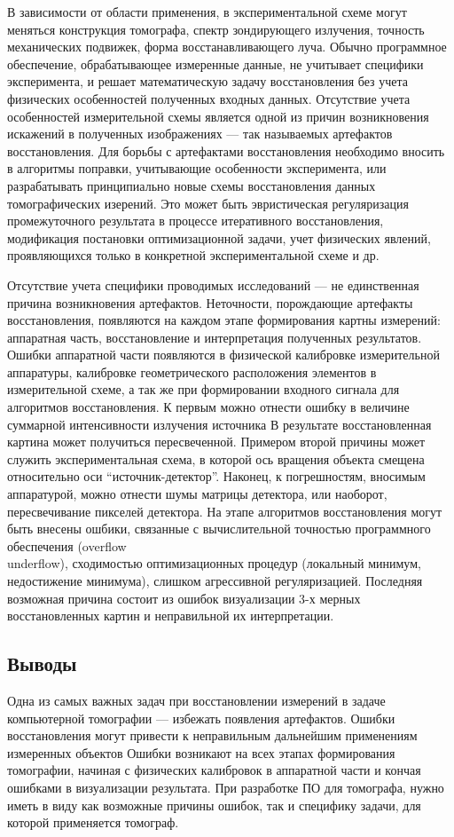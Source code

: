 В зависимости от области применения, в экспериментальной схеме могут меняться конструкция томографа, спектр зондирующего излучения, точность механических подвижек, форма восстанавливающего луча.
Обычно программное обеспечение, обрабатывающее измеренные данные, не учитывает специфики эксперимента, и решает математическую задачу восстановления без учета физических особенностей полученных входных данных.
Отсутствие учета особенностей измерительной схемы является одной из причин возникновения искажений в полученных изображениях --- так называемых артефактов восстановления.
Для борьбы с артефактами восстановления необходимо вносить в алгоритмы поправки, учитывающие особенности эксперимента, или разрабатывать принципиально новые схемы восстановления данных томографических изерений.
Это может быть эвристическая регуляризация промежуточного результата в процессе итеративного восстановления, модификация постановки оптимизационной задачи, учет физических явлений, проявляющихся только в конкретной экспериментальной схеме и др.


Отсутствие учета специфики проводимых исследований --- не единственная причина возникновения артефактов. 
Неточности, порождающие артефакты восстановления, появляются на каждом этапе формирования картны измерений: аппаратная часть, восстановление и интерпретация полученных результатов.
Ошибки аппаратной части появляются в физической калибровке измерительной аппаратуры, калибровке геометрического расположения элементов в измерительной схеме, а так же при формировании входного сигнала для алгоритмов восстановления. 
К первым можно отнести ошибку в величине суммарной интенсивности излучения источника
В результате восстановленная картина может получиться пересвеченной.
Примером второй причины может служить экспериментальная схема, в которой ось вращения объекта смещена относительно оси ``источник-детектор''.
Наконец, к погрешностям, вносимым аппаратурой, можно отнести шумы матрицы детектора, или наоборот, пересвечивание пикселей детектора.
На этапе алгоритмов восстановления могут быть внесены ошбики, связанные с вычислительной точностью программного обеспечения (overflow\\underflow), сходимостью оптимизационных процедур (локальный минимум, недостижение минимума), слишком агрессивной регуляризацией. 
Последняя возможная причина состоит из ошибок визуализации 3-х мерных восстановленных картин и неправильной их интерпретации.

\subsection{Выводы}
Одна из самых важных задач при восстановлении измерений в задаче компьютерной томографии --- избежать появления артефактов.
Ошибки восстановления могут привести к неправильным дальнейшим применениям измеренных объектов
Ошибки возникают на всех этапах формирования томографии, начиная с физических калибровок в аппаратной части и кончая ошибками в визуализации результата.
При разработке ПО для томографа, нужно иметь в виду как возможные причины ошибок, так и специфику задачи, для которой применяется томограф.

